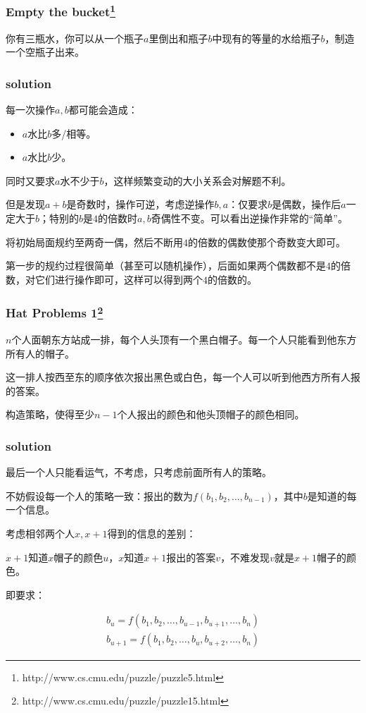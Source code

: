 \documentclass[10pt]{beamer}
\begin{document}
	\clearpage
	\begin{frame}
		\frametitle{Empty the bucket\footnote[1]{http://www.cs.cmu.edu/puzzle/puzzle5.html}}
	
		你有三瓶水，你可以从一个瓶子$a$里倒出和瓶子$b$中现有的等量的水给瓶子$b$，制造一个空瓶子出来。
	
	\end{frame}
	\clearpage
	\begin{frame}
		\frametitle{solution}
	
		每一次操作$a,b$都可能会造成：
		\begin{itemize}
			\item $a$水比$b$多/相等。
			\item $a$水比$b$少。
		\end{itemize}
		同时又要求$a$水不少于$b$，这样频繁变动的大小关系会对解题不利。

		但是发现$a+b$是奇数时，操作可逆，考虑逆操作$b,a$：仅要求$b$是偶数，操作后$a$一定大于$b$；特别的$b$是$4$的倍数时$a,b$奇偶性不变。{\color{red}可以看出逆操作非常的“简单”。}

		将初始局面规约至两奇一偶，然后不断用$4$的倍数的偶数使那个奇数变大即可。

		第一步的规约过程很简单（甚至可以随机操作），后面如果两个偶数都不是$4$的倍数，对它们进行操作即可，这样可以得到两个$4$的倍数的。
	\end{frame}
	\clearpage
	\begin{frame}
		\frametitle{Hat Problems 1\footnote[1]{http://www.cs.cmu.edu/puzzle/puzzle15.html}}
	
		$n$个人面朝东方站成一排，每个人头顶有一个黑白帽子。每一个人只能看到他东方所有人的帽子。

		这一排人按西至东的顺序依次报出黑色或白色，每一个人可以听到他西方所有人报的答案。

		构造策略，使得至少$n-1$个人报出的颜色和他头顶帽子的颜色相同。
	
	\end{frame}
	\clearpage
	\begin{frame}
		\frametitle{solution}
	
		最后一个人只能看运气，不考虑，只考虑前面所有人的策略。

		不妨假设每一个人的策略一致：报出的数为$f(b_1,b_2,\dots,b_{n-1})$，其中$b$是知道的每一个信息。

		考虑相邻两个人$x,x+1$得到的信息的差别：

		$x+1$知道$x$帽子的颜色$u$，$x$知道$x+1$报出的答案$v$，不难发现$v$就是$x+1$帽子的颜色。

		即要求：

		$$
		\begin{aligned}
			b_u=f(b_1,b_2,\dots,b_{u-1},b_{u+1},\dots,b_n)\\
			b_{u+1}=f(b_1,b_2,\dots,b_{u},b_{u+2},\dots,b_n)
		\end{aligned}
		$$

	\end{frame}
	
\end{document}
